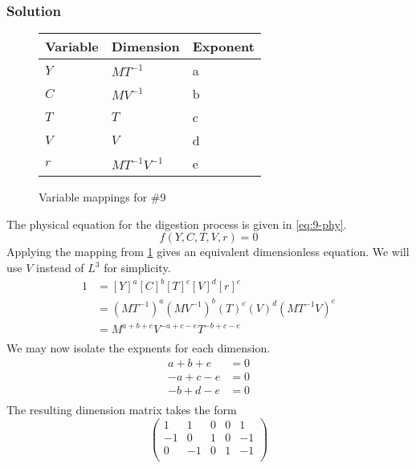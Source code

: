 \documentclass[12pt]{article}
\begin{document}
  \subsubsection*{Solution}
  \begin{figure}
    \centering
    \begin{tabularx}{0.5\textwidth}{XXX}
      Variable & Dimension & Exponent \\ \midrule
      $Y$ & $MT^{-1}$ & a \\
      $C$ & $MV^{-1}$ & b \\
      $T$ & $T$ & c \\
      $V$ & $V$ & d \\
      $r$ & $MT^{-1}V^{-1}$ & e \\
    \end{tabularx}
    \caption{Variable mappings for \#9}
\label{fig:9-var-mappings}
  \end{figure}
  The physical equation for the digestion process is given in \cref{eq:9-phy}.
  \begin{equation}
    \label{eq:9-phy}
    f(Y,C,T,V,r)=0
  \end{equation}
  Applying the mapping from \cref{fig:9-var-mappings} gives an equivalent
  dimensionless equation. We will use $V$ instead of $L^3$ for simplicity.
  \begin{equation*}
    \begin{aligned}
      1 &= {[Y]}^a {[C]}^b {[T]}^c {[V]}^d {[r]}^e \\
      &= {(MT^{-1})}^a {(MV^{-1})}^b {(T)}^c {(V)}^d {(MT^{-1}V)}^e \\
      &= M^{a+b+e}V^{-a+c-e}T^{-b+c-e} \\
    \end{aligned}
  \end{equation*}
  We may now isolate the expnents for each dimension.
  \begin{equation*}
    \begin{aligned}
      a + b + e &= 0 \\
      -a + c - e &= 0 \\
      -b + d - e &= 0 \\
    \end{aligned}
  \end{equation*}
  The resulting dimension matrix takes the form
  \begin{equation*}
    \begin{pmatrix}
      1 & 1 & 0 & 0 & 1 \\
      -1 & 0 & 1 & 0 & -1 \\
      0 & -1 & 0 & 1 & -1 \\
    \end{pmatrix}
  \end{equation*}
\end{document}

